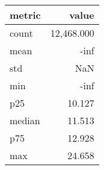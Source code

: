 \begin{tabular}{lr}
\toprule
metric & value \\
\midrule
count & 12,468.000 \\
mean & -inf \\
std & NaN \\
min & -inf \\
p25 & 10.127 \\
median & 11.513 \\
p75 & 12.928 \\
max & 24.658 \\
\bottomrule
\end{tabular}
